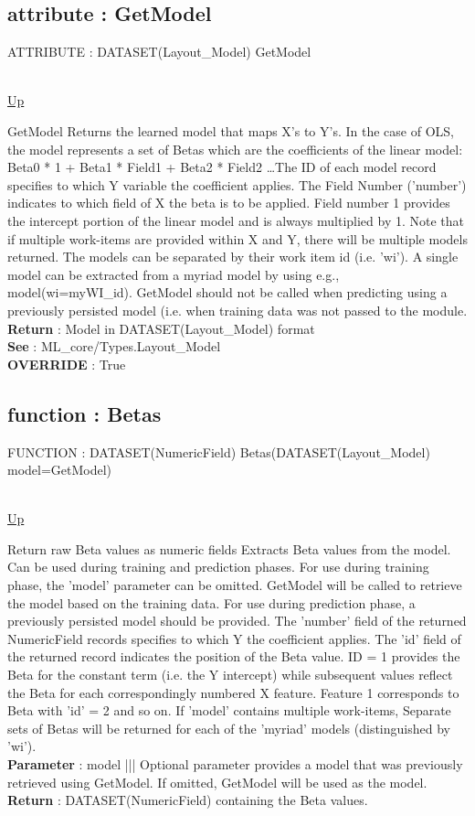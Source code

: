 \subsection*{attribute : GetModel}
\hypertarget{ecldoc:linearregression.ols.getmodel}{ATTRIBUTE : DATASET(Layout\_Model) GetModel} \\
\hyperlink{ecldoc:linearregression.ols}{Up} \\
\par
GetModel Returns the learned model that maps X's to Y's. In the case of OLS, the model represents a set of Betas which are the coefficients of the linear model: Beta0 * 1 + Beta1 * Field1 + Beta2 * Field2 \ldots The ID of each model record specifies to which Y variable the coefficient applies. The Field Number ('number') indicates to which field of X the beta is to be applied. Field number 1 provides the intercept portion of the linear model and is always multiplied by 1. Note that if multiple work-items are provided within X and Y, there will be multiple models returned. The models can be separated by their work item id (i.e. 'wi'). A single model can be extracted from a myriad model by using e.g., model(wi=myWI\_id). GetModel should not be called when predicting using a previously persisted model (i.e. when training data was not passed to the module. \\
\textbf{Return} : Model in DATASET(Layout\_Model) format \\
\textbf{See} : ML\_core/Types.Layout\_Model \\
\textbf{OVERRIDE} : True \\
\subsection*{function : Betas}
\hypertarget{ecldoc:linearregression.ols.betas}{FUNCTION : DATASET(NumericField) Betas(DATASET(Layout\_Model) model=GetModel)} \\
\hyperlink{ecldoc:linearregression.ols}{Up} \\
\par
Return raw Beta values as numeric fields Extracts Beta values from the model. Can be used during training and prediction phases. For use during training phase, the 'model' parameter can be omitted. GetModel will be called to retrieve the model based on the training data. For use during prediction phase, a previously persisted model should be provided. The 'number' field of the returned NumericField records specifies to which Y the coefficient applies. The 'id' field of the returned record indicates the position of the Beta value. ID = 1 provides the Beta for the constant term (i.e. the Y intercept) while subsequent values reflect the Beta for each correspondingly numbered X feature. Feature 1 corresponds to Beta with 'id' = 2 and so on. If 'model' contains multiple work-items, Separate sets of Betas will be returned for each of the 'myriad' models (distinguished by 'wi'). \\
\textbf{Parameter} : model ||| Optional parameter provides a model that was previously retrieved using GetModel. If omitted, GetModel will be used as the model. \\
\textbf{Return} : DATASET(NumericField) containing the Beta values. \\
